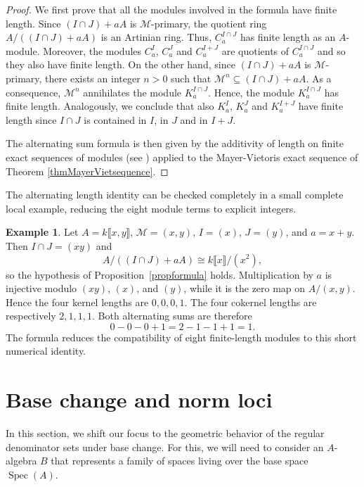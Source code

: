 \documentclass[11pt,leqno]{amsart}
\theoremstyle{definition}
\newtheorem{example}[theorem]{Example}
\numberwithin{equation}{section}
\DeclareMathOperator{\Spec}{Spec}
\begin{document}
\begin{proof}
We first prove that all the modules involved in the formula have finite length. Since $(I \cap J) + aA$ is $\mathcal{M}$-primary, the quotient ring $A / ((I \cap J) + aA)$ is an Artinian ring. Thus, $C_a^{I \cap J}$ has finite length as an $A$-module. Moreover, the modules $C_a^I$, $C_a^J$ and $C_a^{I+J}$ are quotients of $C_a^{I \cap J}$ and so they also have finite length. On the other hand, since $(I \cap J) + aA$ is $\mathcal{M}$-primary, there exists an integer $n > 0$ such that $\mathcal{M}^n \subseteq (I \cap J) + aA$. As a consequence, $\mathcal{M}^n$ annihilates the module $K_a^{I \cap J}$. Hence, the module $K_a^{I \cap J}$ has finite length. Analogously, we conclude that also $K_a^I$, $K_a^J$ and $K_a^{I+J}$ have finite length since $I\cap J$ is contained in $I$, in $J$ and in $I+J$.

The alternating sum formula is then given by the additivity of length on finite exact sequences of modules (see \cite[Proposition~6.9, p.~78]{AM69}) applied to the Mayer-Vietoris exact sequence of Theorem \ref{thmMayerVietsequence}. 
\end{proof}

The alternating length identity can be checked completely in a small complete local example, reducing the eight module terms to explicit integers.

\begin{example}
Let $A=k\llbracket x,y\rrbracket$, $\mathcal M=(x,y)$, $I=(x)$, $J=(y)$, and $a=x+y$. Then $I\cap J=(xy)$ and
\[
A/((I\cap J)+aA)\cong k\llbracket x\rrbracket/(x^2),
\]
so the hypothesis of Proposition~\ref{propformula} holds. Multiplication by $a$ is injective modulo $(xy)$, $(x)$, and $(y)$, while it is the zero map on $A/(x,y)$. Hence the four kernel lengths are $0,0,0,1$. The four cokernel lengths are respectively $2,1,1,1$. Both alternating sums are therefore
\[
0-0-0+1=2-1-1+1=1.
\]
The formula reduces the compatibility of eight finite-length modules to this short numerical identity.
\end{example}

\section{Base change and norm loci}\label{sec:basechange}
In this section, we shift our focus to the geometric behavior of the regular denominator sets under base change. For this, we will need to consider an $A$-algebra $B$ that represents a family of spaces living over the base space $\Spec(A)$.
\end{document}

